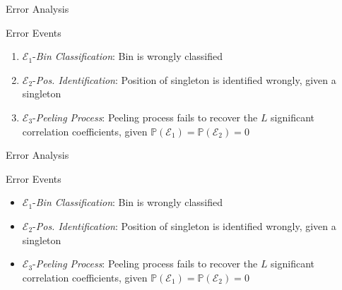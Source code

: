 \documentclass[10pt,xcolor=table]{beamer}
\newcommand{\mc}{\mathcal}
\newcommand{\mbb}{\mathbb}
\begin{document}
\begin{frame}{Error Analysis}

\begin{block}{Error Events}
\begin{enumerate}\small
	\item {\color{red}$\mathcal{E}_1${-\it Bin Classification}}: Bin is wrongly classified
	\item {\color{blue}$\mathcal{E}_2${-\it Pos. Identification}}: Position of singleton is identified wrongly, given a singleton
	\item {\color{blue}$\mathcal{E}_3${-\it Peeling Process}}: Peeling process fails to recover the $L$ significant correlation coefficients, given $\mbb{P}(\mc{E}_1)= \mbb{P}(\mc{E}_2)=0$
\end{enumerate}
\end{block}
\end{frame}

\begin{frame}{Error Analysis}

\begin{block}{Error Events}
	\begin{itemize}\small
		\item {\color{blue}$\mathcal{E}_1${-\it Bin Classification}}: Bin is wrongly classified
		\item {\color{red}$\mathcal{E}_2${-\it Pos. Identification}}: Position of singleton is identified wrongly, given a singleton
		\item {\color{blue}$\mathcal{E}_3${-\it Peeling Process}}: Peeling process fails to recover the $L$ significant correlation coefficients, given $\mbb{P}(\mc{E}_1)= \mbb{P}(\mc{E}_2)=0$
	\end{itemize}
\end{block}
\end{frame}



\end{document}
